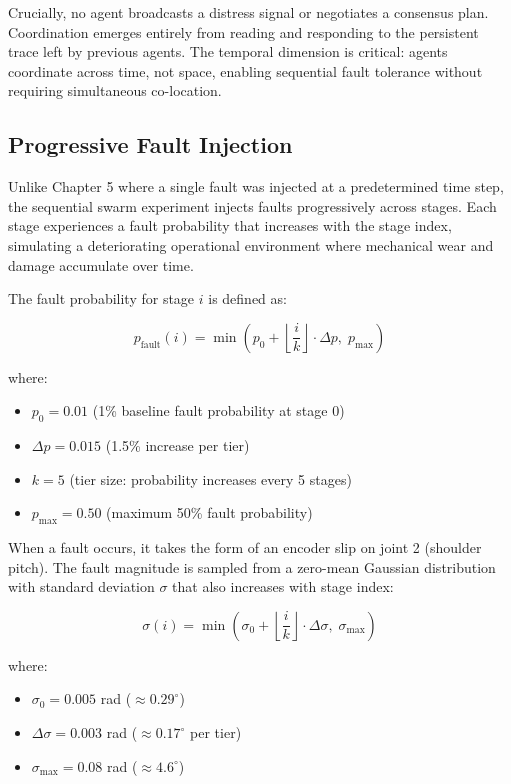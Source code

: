 \documentclass[12pt,a4paper,oneside]{report}
\begin{document}
Crucially, no agent broadcasts a distress signal or negotiates a consensus plan. Coordination emerges entirely from reading and responding to the persistent trace left by previous agents. The temporal dimension is critical: agents coordinate across time, not space, enabling sequential fault tolerance without requiring simultaneous co-location.

\subsection{Progressive Fault Injection}

Unlike Chapter 5 where a single fault was injected at a predetermined time step, the sequential swarm experiment injects faults progressively across stages. Each stage experiences a fault probability that increases with the stage index, simulating a deteriorating operational environment where mechanical wear and damage accumulate over time.

The fault probability for stage $i$ is defined as:

\begin{equation}
p_{\text{fault}}(i) = \min\left(p_0 + \left\lfloor \frac{i}{k} \right\rfloor \cdot \Delta p,\; p_{\text{max}}\right)
\end{equation}

where:
\begin{itemize}
    \item $p_0 = 0.01$ (1\% baseline fault probability at stage 0)
    \item $\Delta p = 0.015$ (1.5\% increase per tier)
    \item $k = 5$ (tier size: probability increases every 5 stages)
    \item $p_{\text{max}} = 0.50$ (maximum 50\% fault probability)
\end{itemize}

When a fault occurs, it takes the form of an encoder slip on joint 2 (shoulder pitch). The fault magnitude is sampled from a zero-mean Gaussian distribution with standard deviation $\sigma$ that also increases with stage index:

\begin{equation}
\sigma(i) = \min\left(\sigma_0 + \left\lfloor \frac{i}{k} \right\rfloor \cdot \Delta \sigma,\; \sigma_{\text{max}}\right)
\end{equation}

where:
\begin{itemize}
    \item $\sigma_0 = 0.005$ rad ($\approx 0.29^\circ$)
    \item $\Delta \sigma = 0.003$ rad ($\approx 0.17^\circ$ per tier)
    \item $\sigma_{\text{max}} = 0.08$ rad ($\approx 4.6^\circ$)
\end{itemize}
\end{document}
